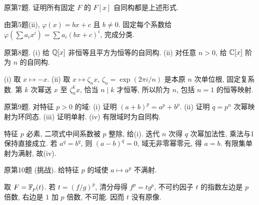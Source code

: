 \begin{exercise}原第7题. 证明所有固定 $F$ 的 $F[x]$ 自同构都是上述形式.\end{exercise}
\begin{solution}
由第5题(ii), $\varphi(x)=bx+c$ 且 $b\ne0$. 固定每个系数给 $\varphi(\sum a_ix^i)=\sum a_i(bx+c)^i$, 完成分类.
\end{solution}
\begin{exercise}原第8题. (i) 给 $\mathbb Q[x]$ 非恒等且平方为恒等的自同构. (ii) 对任意 $n>0$, 给 $\mathbb C[x]$ 阶为 $n$ 的自同构.\end{exercise}
\begin{solution}
(i) 取 $x\mapsto-x$. (ii) 取 $x\mapsto\zeta_n x$, $\zeta_n=\exp(2\pi i/n)$ 是本原 $n$ 次单位根, 固定复系数. 第 $k$ 次幂送 $x$ 至 $\zeta_n^kx$, 恰当 $n\mid k$ 才恒等, 所以阶为 $n$, 包括 $n=1$ 的恒等映射.
\end{solution}
\begin{exercise}原第9题. 对特征 $p>0$ 的域: (i) 证明 $(a+b)^p=a^p+b^p$. (ii) 证明 $q=p^n$ 次幂映射为环同态. (iii) 证明单射. (iv) 有限域时为自同构.\end{exercise}
\begin{solution}
特征 $p$ 必素, 二项式中间系数被 $p$ 整除, 给(i). 迭代 $n$ 次得 $q$ 次幂加法性, 乘法与1保持直接成立. 若 $a^q=b^q$, 则 $(a-b)^q=0$, 域无非零幂零元, 得 $a=b$. 有限集单射为满射, 故(iv).
\end{solution}
\begin{exercise}原第10题 (挑战). 给特征 $p$ 的域使 $a\mapsto a^p$ 不满射.\end{exercise}
\begin{solution}
取 $F=\mathbb F_p(t)$. 若 $t=(f/g)^p$, 清分母得 $f^p=tg^p$, 不可约因子 $t$ 的指数左边是 $p$ 倍数, 右边是 $1$ 加 $p$ 倍数, 不可能. 因而 $t$ 没有原像.
\end{solution}
